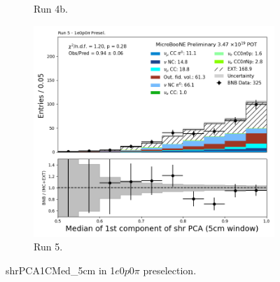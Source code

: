 \begin{figure}[H]
\begin{subfigure}[t]{0.32\linewidth}
        \caption{Run 4b.}
    \end{subfigure}%
    \hspace{0.2cm}%
    \begin{subfigure}[t]{0.32\linewidth}
        \includegraphics[width=\linewidth]{technote/Appendix_Preselection/Figures/1e0p0pi/Run5/shrPCA1CMed_5cm_Run5_1e0p0pi_Presel.png}
        \caption{Run 5.}
    \end{subfigure}
    \caption{shrPCA1CMed\_5cm in 1$e$0$p$0$\pi$ preselection.}
\end{figure}

